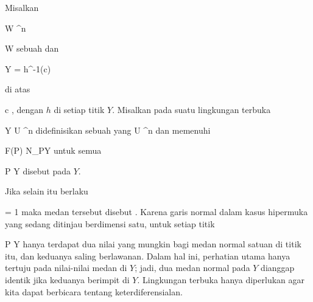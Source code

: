 {}
{

Misalkan

\mavergleichskette
{\vergleichskette
{ W
}
{ \subseteq }{ \R^n
}
{  }{
}
{    }{
}
{   }{
}
}
{}{}{}

 { W } { \R
} {}
sebuah
dan

\mavergleichskette
{\vergleichskette
{ Y
}
{ = }{ h^{-1}(c)
}
{  }{
}
{    }{
}
{   }{
}
}
{}{}{}

di atas

\mavergleichskette
{\vergleichskette
{ c
}
{ \in }{ \R
}
{  }{
}
{    }{
}
{   }{
}
}
{}{}{,}
dengan $h$
di setiap titik $Y$. Misalkan pada suatu lingkungan terbuka

\mavergleichskette
{\vergleichskette
{ Y
}
{ \subseteq }{ U
}
{ \subseteq }{ \R^n
}
{    }{
}
{   }{
}
}
{}{}{}
didefinisikan sebuah
yang
 {U} {\R^n
} {}
dan memenuhi

\mavergleichskettedisp
{\vergleichskette
{ F(P)
}
{ \in} { N_PY
}
{ } {
}
{ } {
}
{ } {
}
}
{}{}{}
untuk semua

\mavergleichskette
{\vergleichskette
{ P
}
{ \in }{ Y
}
{  }{
}
{    }{
}
{   }{
}
}
{}{}{}
disebut
pada $Y$.

}

Jika selain itu berlaku

\mavergleichskettedisp
{\vergleichskette
{  \Vert
}
{ =} { 1
}
{ } {
}
{ } {
}
{ } {
}
}
{}{}{}
maka medan tersebut disebut
 {.} Karena garis normal dalam kasus hipermuka yang sedang ditinjau berdimensi satu, untuk setiap titik

\mavergleichskette
{\vergleichskette
{ P
}
{ \in }{ Y
}
{  }{
}
{    }{
}
{   }{
}
}
{}{}{}
hanya terdapat dua nilai yang mungkin bagi medan normal satuan di titik itu, dan keduanya saling berlawanan. Dalam hal ini, perhatian utama hanya tertuju pada nilai-nilai medan di $Y$; jadi, dua medan normal pada $Y$ dianggap identik jika keduanya berimpit di $Y$. Lingkungan terbuka hanya diperlukan agar kita dapat berbicara tentang keterdiferensialan.



